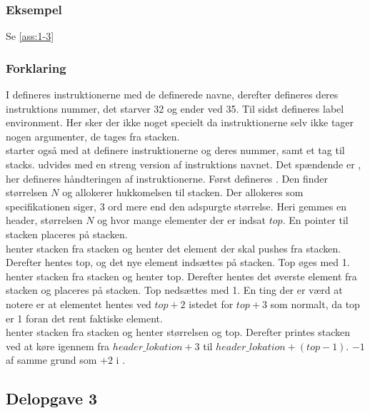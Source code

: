 \subsubsection{Eksempel}
Se \ref{ass:1-3}

\subsubsection{Forklaring}
I  defineres instruktionerne med de definerede navne, derefter defineres deres instruktions nummer, det starver 32 og ender ved 35. Til sidst defineres label environment. Her sker der ikke noget specielt da instruktionerne selv ikke tager nogen argumenter, de tages fra stacken.\\[1ex]

 starter også med at definere instruktionerne og deres nummer, samt et tag til stacks.  udvides med en streng version af instruktions navnet. Det spændende er , her defineres håndteringen af instruktionerne. Først defineres . Den finder størrelsen $N$ og allokerer hukkomelsen til stacken. Der allokeres som specifikationen siger, 3 ord mere end den adspurgte størrelse. Heri gemmes en header, størrelsen $N$ og hvor mange elementer der er indsat $top$. En pointer til stacken placeres på stacken.\\

 henter stacken fra stacken og henter det element der skal pushes fra stacken. Derefter hentes top, og det nye element indsættes på stacken. Top øges med 1.\\

 henter stacken fra stacken og henter top. Derefter hentes det øverste element fra stacken og placeres på stacken. Top nedsættes med 1. En ting der er værd at notere er at elementet hentes ved $top+2$ istedet for $top+3$ som normalt, da top er 1 foran det rent faktiske element.\\

 henter stacken fra stacken og henter størrelsen og top. Derefter printes stacken ved at køre igennem fra $header\_lokation+3$ til $header\_lokation + (top-1)$. $-1$ af samme grund som $+2$ i .



\subsection{Delopgave 3}\label{ass:2-3}
